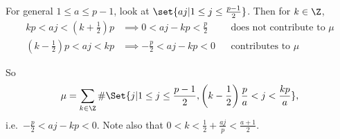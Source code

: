 \documentclass{article}
\newcommand{\legendre}[2]{\genfrac{(}{)}{}{}{#1}{#2}}
\begin{document}
For general $1 \leq a \leq p-1$, look at $\set{aj | 1 \leq j \leq \frac{p-1}{2}}$.
Then for $k \in \Z$,
\begin{align*}
    kp < aj < \left(k+ \frac{1}{2}\right) p &\implies 0 < aj - kp < \frac{p}{2} & &\text{does not contribute to $\mu$} \\
    \left(k-\frac{1}{2}\right)p < aj < kp &\implies -\frac{p}{2} < aj - kp < 0 & &\text{contributes to $\mu$}
\end{align*}

So
\begin{equation*}
\mu = \sum_{k \in \Z} \#\Set{j | 1 \leq j \leq \frac{p-1}{2}, \left(k-\frac{1}{2}\right) \frac{p}{a} < j < \frac{kp}{a}},
\end{equation*}
i.e.\ $-\frac{p}{2} < aj - kp < 0$.
Note also that $0 < k < \frac{1}{2} + \frac{a j}{p} < \frac{a+1}{2}$.

\end{document}
